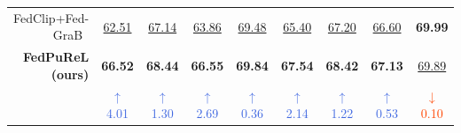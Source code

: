 \documentclass[10pt,twocolumn,letterpaper]{article}
\makeatletter
\newcommand{\blueup}[1]{\textcolor{RoyalBlue}{$\uparrow$ #1}}
\newcommand{\reddown}[1]{\textcolor{OrangeRed}{$\downarrow$ #1}}
\newcommand{\thickhline}{%
  \noalign{\ifnum0=`}\fi\hrule height 1pt\relax
  \futurelet\reserved@a\@xhline
}
\makeatother
\begin{document}
\begin{table}[!t]
{{\begin{tabular}{r||cc|cc|cc|cc}
 FedClip+Fed-GraB~\cite{Fed-Grab}
 & \underline{62.51} & \underline{67.14} & \underline{63.86} & \underline{69.48}
 & \underline{65.40} & \underline{67.20} & \underline{66.60} & \textbf{69.99} \\
 
\cellcolor[HTML]{D7F6FF}\textbf{FedPuReL (ours)}
 & \cellcolor[HTML]{D7F6FF}\textbf{66.52} & \cellcolor[HTML]{D7F6FF}\textbf{68.44} & \cellcolor[HTML]{D7F6FF}\textbf{66.55} & \cellcolor[HTML]{D7F6FF}\textbf{69.84}
 & \cellcolor[HTML]{D7F6FF}\textbf{67.54} & \cellcolor[HTML]{D7F6FF}\textbf{68.42} & \cellcolor[HTML]{D7F6FF}\textbf{67.13} & \cellcolor[HTML]{D7F6FF}\underline{69.89} \\
 
\textcolor{gray!60}&
\blueup{4.01} & \blueup{1.30} &
\blueup{2.69} & \blueup{0.36} &
\blueup{2.14} & \blueup{1.22} &
\blueup{0.53} & \reddown{0.10} \\

\end{tabular}}
}
\vspace{-12pt}
\label{tab:cifar100_lt}
\end{table}
\end{document}
